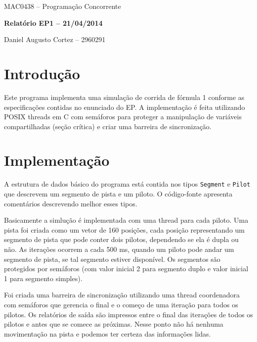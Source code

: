 \documentclass[12pt]{article}
\begin{document}
\begin{center}
{\large \sc MAC0438 -- Programação Concorrente}

\vspace{0.2cm}

{\large \bf Relatório EP1 -- 21/04/2014}

\vspace{0.5cm}

{\large Daniel Augusto Cortez -- 2960291}

\vspace{0.5cm}
\end{center}    


\section{Introdução}

Este programa implementa uma simulação de corrida de fórmula 1 conforme as especificações 
contidas no enunciado do EP. A implementação é feita utilizando POSIX threads em C com semáforos
para proteger a manipulação de variáveis compartilhadas (seção crítica) e criar uma barreira de
sincronização.


\section{Implementação}

A estrutura de dados básico do programa está contida nos tipos \verb|Segment| e \verb|Pilot| que 
descrevem um segmento de pista e um piloto. O código-fonte apresenta comentários descrevendo 
melhor esses tipos.

Basicamente a simlução é implementada com uma thread para cada piloto. Uma pista foi criada 
como um vetor de 160 posições, cada posição representando um segmento de pista que pode conter
dois pilotos, dependendo se ela é dupla ou não. As iterações ocorrem a cada 500 ms, quando um 
piloto pode andar um segmento de pista, se tal segmento estiver disponível. Os segmentos são
protegidos por semáforos (com valor inicial 2 para segmento duplo e valor inicial 1 para 
segmento simples).

Foi criada uma barreira de sincronização utilizando uma thread coordenadora com semáforos que 
gerencia o final e o começo de uma iteração para todos os pilotos. Os relatórios de saída são 
impressos entre o final das iterações de todos os pilotos e antes que se comece as próximas. 
Nesse ponto não há nenhuma movimentação na pista e podemos ter certeza das informações lidas.
\end{document}
